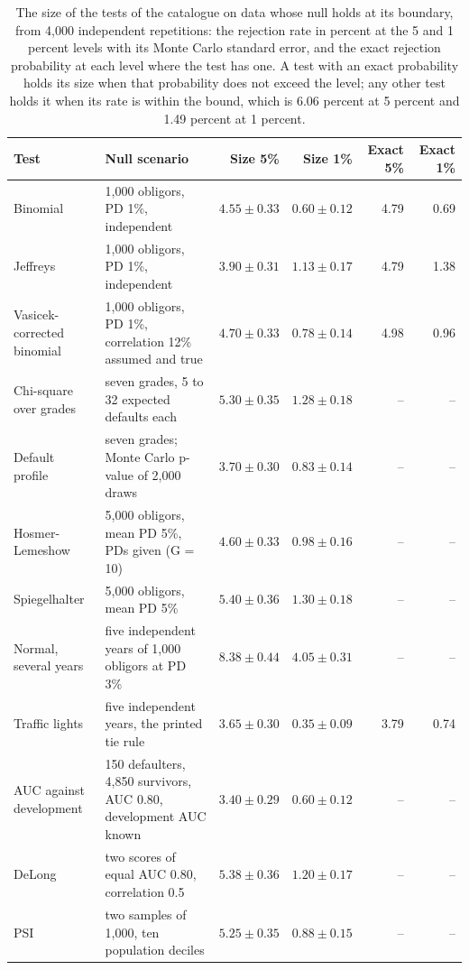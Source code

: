 \begin{table}[htbp]
\centering
\setlength{\tabcolsep}{3pt}
\footnotesize
\renewcommand{\arraystretch}{0.88}
\caption{The size of the tests of the catalogue on data whose null holds at its boundary, from 4,000 independent repetitions: the rejection rate in percent at the 5 and 1 percent levels with its Monte Carlo standard error, and the exact rejection probability at each level where the test has one. A test with an exact probability holds its size when that probability does not exceed the level; any other test holds it when its rate is within the bound, which is 6.06 percent at 5 percent and 1.49 percent at 1 percent.}
\label{tab:vt-size}
\begin{tabular}{lp{3.1cm}rrrr}
\toprule
Test & Null scenario & Size 5\% & Size 1\% & Exact 5\% & Exact 1\% \\
\midrule
Binomial & 1,000 obligors, PD 1\%, independent & $4.55\pm0.33$ & $0.60\pm0.12$ & 4.79 & 0.69 \\
Jeffreys & 1,000 obligors, PD 1\%, independent & $3.90\pm0.31$ & $1.13\pm0.17$ & 4.79 & 1.38 \\
Vasicek-corrected binomial & 1,000 obligors, PD 1\%, correlation 12\% assumed and true & $4.70\pm0.33$ & $0.78\pm0.14$ & 4.98 & 0.96 \\
Chi-square over grades & seven grades, 5 to 32 expected defaults each & $5.30\pm0.35$ & $1.28\pm0.18$ & -- & -- \\
Default profile & seven grades; Monte Carlo p-value of 2,000 draws & $3.70\pm0.30$ & $0.83\pm0.14$ & -- & -- \\
Hosmer-Lemeshow & 5,000 obligors, mean PD 5\%, PDs given (G = 10) & $4.60\pm0.33$ & $0.98\pm0.16$ & -- & -- \\
Spiegelhalter & 5,000 obligors, mean PD 5\% & $5.40\pm0.36$ & $1.30\pm0.18$ & -- & -- \\
Normal, several years & five independent years of 1,000 obligors at PD 3\% & $8.38\pm0.44$ & $4.05\pm0.31$ & -- & -- \\
Traffic lights & five independent years, the printed tie rule & $3.65\pm0.30$ & $0.35\pm0.09$ & 3.79 & 0.74 \\
AUC against development & 150 defaulters, 4,850 survivors, AUC 0.80, development AUC known & $3.40\pm0.29$ & $0.60\pm0.12$ & -- & -- \\
DeLong & two scores of equal AUC 0.80, correlation 0.5 & $5.38\pm0.36$ & $1.20\pm0.17$ & -- & -- \\
PSI & two samples of 1,000, ten population deciles & $5.25\pm0.35$ & $0.88\pm0.15$ & -- & -- \\

\end{tabular}
\end{table}
